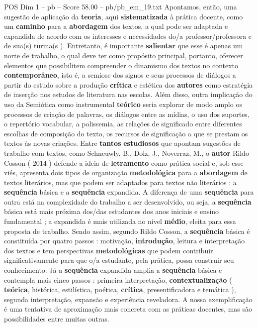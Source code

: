 \begin{textsample}{POS Dim 1 – pb – Score 58.00 – pb/pb\_em\_19.txt}
Apontamos, então, uma sugestão de aplicação da \textbf{teoria}, aqui \textbf{sistematizada} à prática docente, como um \textbf{caminho} para a \textbf{abordagem} dos textos, a qual pode ser adaptada e expandida de acordo com os interesses e necessidades do/a professor/professora e de sua(s) turma(s ).
Entretanto, é importante \textbf{salientar} que esse é apenas um norte de trabalho, o qual deve ter como propósito principal, portanto, oferecer elementos que possibilitem compreender o dinamismo dos textos no contexto \textbf{contemporâneo}, isto é, a semiose dos signos e seus processos de diálogos a partir do estudo sobre a produção \textbf{crítica} e estética dos \textbf{autores} como estratégia de inserção nos estudos de literatura nas escolas.
Além disso, outra implicação do uso da Semiótica como instrumental \textbf{teórico} seria explorar de modo amplo os processos de criação de palavras, os diálogos entre as mídias, o uso dos suportes, o repertório vocabular, a polissemia, as relações de significado entre diferentes escolhas de composição do texto, os recursos de significação a que se prestam os textos às novas criações.
Entre \textbf{tantos} \textbf{estudiosos} que apontam sugestões de trabalho com textos, como Schneuwly, B., Dolz, J., Noverraz, M., o \textbf{autor} Rildo Cosson ( 2014 ) defende a ideia de \textbf{letramento} como prática social e, sob esse viés, apresenta dois tipos de organização \textbf{metodológica} para a \textbf{abordagem} de textos literários, mas que podem ser adaptados para textos não literários : a \textbf{sequência} básica e a \textbf{sequência} expandida.
A diferença de uma \textbf{sequência} para outra está na complexidade do trabalho a ser desenvolvido, ou seja, a \textbf{sequência} básica está mais próxima dos/das estudantes dos anos iniciais e ensino fundamental ; a expandida é mais utilizada no nível \textbf{médio}, eleita para essa proposta de trabalho.
Sendo assim, segundo Rildo Cosson, a \textbf{sequência} básica é constituída por quatro passos : motivação, \textbf{introdução}, leitura e interpretação dos textos e tem perspectivas \textbf{metodológicas} que podem contribuir significativamente para que o/a estudante, pela prática, possa construir seu conhecimento.
Já a \textbf{sequência} expandida amplia a \textbf{sequência} básica e contempla mais cinco passos : primeira interpretação, \textbf{contextualização} ( \textbf{teórica}, histórica, estilística, poética, \textbf{crítica}, presentificadora e temática ), segunda interpretação, expansão e experiência reveladora.
A nossa exemplificação é uma tentativa de aproximação mais concreta com as práticas docentes, mas são possibilidades entre muitas outras.

\end{textsample}
